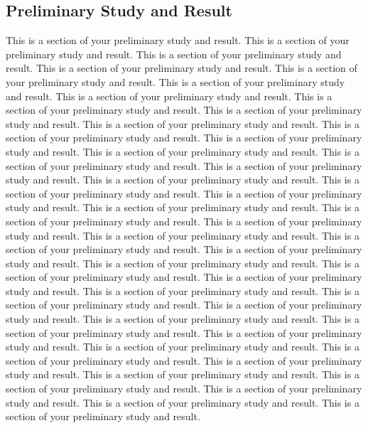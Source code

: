 {
\begin{doublespacing}
\begin{flushleft}
\section{Preliminary Study and Result}

This is a section of your preliminary study and result. This is a section of your preliminary study and result. This is a section of your preliminary study and result. This is a section of your preliminary study and result. This is a section of your preliminary study and result. This is a section of your preliminary study and result. This is a section of your preliminary study and result. This is a section of your preliminary study and result. This is a section of your preliminary study and result. This is a section of your preliminary study and result. This is a section of your preliminary study and result. This is a section of your preliminary study and result. This is a section of your preliminary study and result. This is a section of your preliminary study and result. This is a section of your preliminary study and result. This is a section of your preliminary study and result. This is a section of your preliminary study and result. This is a section of your preliminary study and result. This is a section of your preliminary study and result. This is a section of your preliminary study and result. This is a section of your preliminary study and result. This is a section of your preliminary study and result. This is a section of your preliminary study and result. This is a section of your preliminary study and result. This is a section of your preliminary study and result. This is a section of your preliminary study and result. This is a section of your preliminary study and result. This is a section of your preliminary study and result. This is a section of your preliminary study and result. This is a section of your preliminary study and result. This is a section of your preliminary study and result. This is a section of your preliminary study and result. This is a section of your preliminary study and result. This is a section of your preliminary study and result. This is a section of your preliminary study and result. This is a section of your preliminary study and result. This is a section of your preliminary study and result. This is a section of your preliminary study and result. This is a section of your preliminary study and result. This is a section of your preliminary study and result. This is a section of your preliminary study and result. 


\end{flushleft}
\end{doublespacing}
}